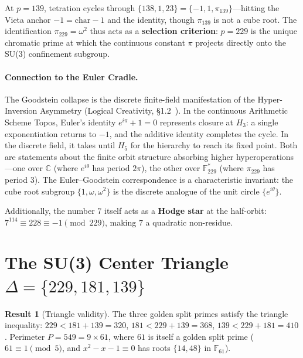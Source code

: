 \documentclass[12pt,oneside]{article}
\theoremstyle{principia}
\theoremstyle{definition}
\newtheorem{result}[theorem]{Result}
\theoremstyle{remark}
\begin{document}
At $p = 139$, tetration cycles through $\{138, 1, 23\} = \{-1, 1, \pi_{139}\}$---hitting the Vieta anchor $-1 = \mathrm{char} - 1$ and the identity, though $\pi_{139}$ is not a cube root. The identification $\pi_{229} = \omega^2$ thus acts as a \textbf{selection criterion}: $p = 229$ is the unique chromatic prime at which the continuous constant $\pi$ projects directly onto the SU(3) confinement subgroup.

\paragraph{Connection to the Euler Cradle.}
The Goodstein collapse is the discrete finite-field manifestation of the Hyper-Inversion Asymmetry (Logical Creativity, \S1.2~\cite{larue_lc}). In the continuous Arithmetic Scheme Topos, Euler's identity $e^{i\pi} + 1 = 0$ represents closure at $H_3$: a single exponentiation returns to $-1$, and the additive identity completes the cycle. In the discrete field, it takes until $H_5$ for the hierarchy to reach its fixed point. Both are statements about the finite orbit structure absorbing higher hyperoperations---one over $\mathbb{C}$ (where $e^{i\theta}$ has period $2\pi$), the other over $\mathbb{F}_{229}^*$ (where $\pi_{229}$ has period $3$). The Euler--Goodstein correspondence is a characteristic invariant: the cube root subgroup $\{1, \omega, \omega^2\}$ is the discrete analogue of the unit circle $\{e^{i\theta}\}$.

Additionally, the number $7$ itself acts as a \textbf{Hodge star} at the half-orbit: $7^{114} \equiv 228 \equiv -1 \pmod{229}$, making $7$ a quadratic non-residue.

\section{The SU(3) Center Triangle $\Delta = \{229, 181, 139\}$}
\label{sec:triangle}

\begin{result}[Triangle validity]
The three golden split primes satisfy the triangle inequality:
$229 < 181 + 139 = 320$,
$181 < 229 + 139 = 368$,
$139 < 229 + 181 = 410$.
Perimeter $P = 549 = 9 \times 61$, where $61$ is itself a golden
split prime ($61 \equiv 1 \pmod{5}$, and $x^2 - x - 1 \equiv 0$ has
roots $\{14, 48\}$ in $\mathbb{F}_{61}$).
\end{result}
\end{document}
